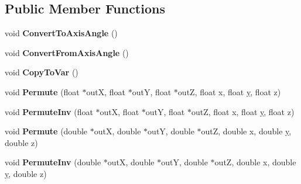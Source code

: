 \subsection*{Public Member Functions}
\begin{DoxyCompactItemize}
\item 
\hypertarget{struct_c_quaternion_ext_abcd0907285531a9f43c71611703cf746}{void {\bfseries Convert\+To\+Axis\+Angle} ()}\label{struct_c_quaternion_ext_abcd0907285531a9f43c71611703cf746}

\item 
\hypertarget{struct_c_quaternion_ext_adccca20e1904d84f684eeb212110586e}{void {\bfseries Convert\+From\+Axis\+Angle} ()}\label{struct_c_quaternion_ext_adccca20e1904d84f684eeb212110586e}

\item 
\hypertarget{struct_c_quaternion_ext_aabcf412be70a50df42e4c343456af761}{void {\bfseries Copy\+To\+Var} ()}\label{struct_c_quaternion_ext_aabcf412be70a50df42e4c343456af761}

\item 
\hypertarget{struct_c_quaternion_ext_a52404992f36f7aabfab5c70be21321f6}{void {\bfseries Permute} (float $\ast$out\+X, float $\ast$out\+Y, float $\ast$out\+Z, float x, float \hyperlink{_ice_utils_8h_aa7ffaed69623192258fb8679569ff9ba}{y}, float z)}\label{struct_c_quaternion_ext_a52404992f36f7aabfab5c70be21321f6}

\item 
\hypertarget{struct_c_quaternion_ext_a8fe54e624e23d754c4ea612346205b6b}{void {\bfseries Permute\+Inv} (float $\ast$out\+X, float $\ast$out\+Y, float $\ast$out\+Z, float x, float \hyperlink{_ice_utils_8h_aa7ffaed69623192258fb8679569ff9ba}{y}, float z)}\label{struct_c_quaternion_ext_a8fe54e624e23d754c4ea612346205b6b}

\item 
\hypertarget{struct_c_quaternion_ext_a5c17c4cb1b6f0b64aca452af8f1f1e85}{void {\bfseries Permute} (double $\ast$out\+X, double $\ast$out\+Y, double $\ast$out\+Z, double x, double \hyperlink{_ice_utils_8h_aa7ffaed69623192258fb8679569ff9ba}{y}, double z)}\label{struct_c_quaternion_ext_a5c17c4cb1b6f0b64aca452af8f1f1e85}

\item 
\hypertarget{struct_c_quaternion_ext_a3551aa22670d075fbfae2422f3157f66}{void {\bfseries Permute\+Inv} (double $\ast$out\+X, double $\ast$out\+Y, double $\ast$out\+Z, double x, double \hyperlink{_ice_utils_8h_aa7ffaed69623192258fb8679569ff9ba}{y}, double z)}\label{struct_c_quaternion_ext_a3551aa22670d075fbfae2422f3157f66}

\end{DoxyCompactItemize}
